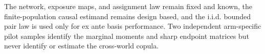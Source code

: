 The network, exposure maps, and assignment law remain fixed and known, the finite-population causal estimand remains design based, and the i.i.d. bounded pair law is used only for ex ante basis performance.  Two independent arm-specific pilot samples identify the marginal moments and sharp endpoint matrices but never identify or estimate the cross-world copula.